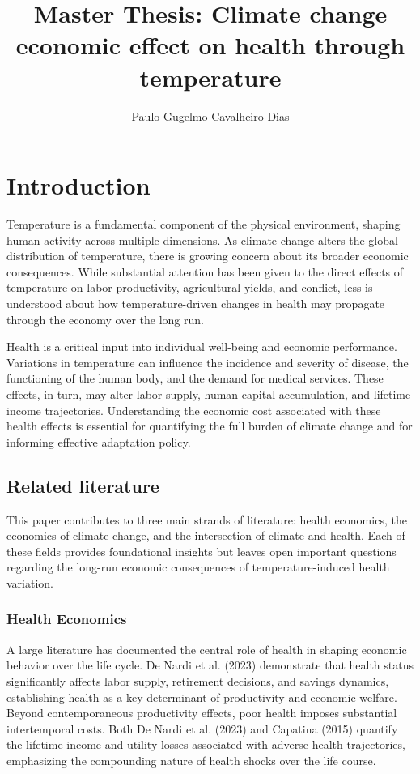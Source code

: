 \documentclass{article}
\author{Paulo Gugelmo Cavalheiro Dias}
\title{Master Thesis: Climate change economic effect on health through temperature}
\begin{document}
\maketitle

\newpage
\tableofcontents

\newpage
\section{Introduction}
Temperature is a fundamental component of the
physical environment, shaping human activity
across multiple dimensions. As climate change
alters the global distribution of temperature,
there is growing concern about its broader
economic consequences. While substantial
attention has been given to the direct effects
of temperature on labor productivity,
agricultural yields, and conflict, less
is understood about how temperature-driven
changes in health may propagate through the
economy over the long run.

Health is a critical input into individual
well-being and economic performance.
Variations in temperature can influence
the incidence and severity of disease,
the functioning of the human body, and
the demand for medical services. These
effects, in turn, may alter labor supply,
human capital accumulation, and lifetime
income trajectories. Understanding the
economic cost associated with these health
effects is essential for quantifying the
full burden of climate change and for
informing effective adaptation policy.

\subsection{Related literature}

This paper contributes to three main strands of literature: health economics, the economics of climate change, and the intersection of climate and health. Each of these fields provides foundational insights but leaves open important questions regarding the long-run economic consequences of temperature-induced health variation.

\subsubsection{Health Economics}

A large literature has documented the central role of health
in shaping economic behavior over the life cycle.
De Nardi et al. (2023) demonstrate that health status
significantly affects labor supply, retirement decisions,
and savings dynamics, establishing health as a key determinant
of productivity and economic welfare.
Beyond contemporaneous productivity effects,
poor health imposes substantial intertemporal costs.
Both De Nardi et al. (2023) and Capatina (2015) quantify
the lifetime income and utility losses associated with
adverse health trajectories, emphasizing the compounding
nature of health shocks over the life course.
\end{document}

